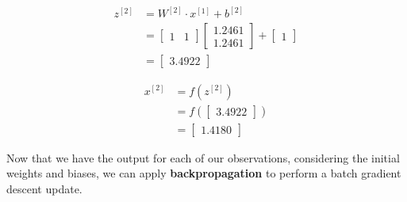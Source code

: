 \documentclass[12pt]{article}
\begin{document}
\begin{enumerate}[leftmargin=\labelsep]
\begin{paracol}{3}
              $$
                  \begin{aligned}
                      z^{[2]} & = W^{[2]} \cdot x^{[1]} + b^{[2]} \\
                              & = \begin{bmatrix}
                                      1 &
                                      1
                                  \end{bmatrix}
                      \begin{bmatrix}
                          1.2461 \\
                          1.2461
                      \end{bmatrix}
                      +
                      \begin{bmatrix}
                          1
                      \end{bmatrix}                              \\
                              & = \begin{bmatrix}{}
                                      3.4922
                                  \end{bmatrix}
                  \end{aligned}
              $$

              $$
                  \begin{aligned}
                      x^{[2]} & = f(z^{[2]})                  \\
                              & = f\left(\begin{bmatrix}{}
                                                 3.4922
                                             \end{bmatrix}\right) \\
                              & = \begin{bmatrix}{}
                                      1.4180
                                  \end{bmatrix}
                  \end{aligned}
              $$

          \end{paracol}

          Now that we have the output for each of our observations, considering
          the initial weights and biases, we can apply \textbf{backpropagation} to
          perform a batch gradient descent update.



\end{enumerate}
\end{document}

